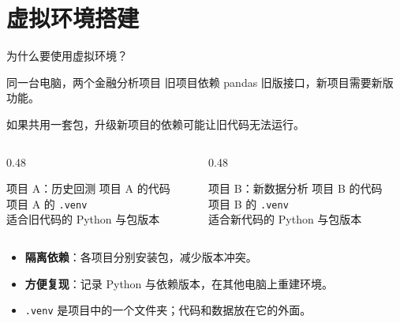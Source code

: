 \documentclass[9pt]{ctexbeamer}
\begin{document}
\section{虚拟环境搭建}

\begin{frame}{为什么要使用虚拟环境？}
  \begin{block}{同一台电脑，两个金融分析项目}
    旧项目依赖 pandas 旧版接口，新项目需要新版功能。\par
    如果共用一套包，升级新项目的依赖可能让旧代码无法运行。
  \end{block}
  \begin{columns}[T,totalwidth=\textwidth]
    \begin{column}{0.48\textwidth}
      \begin{block}{项目 A：历史回测}
        项目 A 的代码\\
        项目 A 的 \texttt{.venv}\\
        适合旧代码的 Python 与包版本
      \end{block}
    \end{column}
    \begin{column}{0.48\textwidth}
      \begin{block}{项目 B：新数据分析}
        项目 B 的代码\\
        项目 B 的 \texttt{.venv}\\
        适合新代码的 Python 与包版本
      \end{block}
    \end{column}
  \end{columns}
  \begin{itemize}
    \item \textbf{隔离依赖}：各项目分别安装包，减少版本冲突。
    \item \textbf{方便复现}：记录 Python 与依赖版本，在其他电脑上重建环境。
    \item \texttt{.venv} 是项目中的一个文件夹；代码和数据放在它的外面。
  \end{itemize}
\end{frame}
\end{document}
